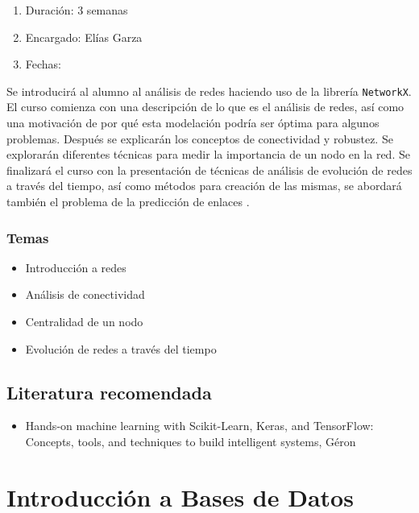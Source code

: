 \documentclass{article}
\begin{document}
            \begin{enumerate}
                \item Duración: 3 semanas
                \item Encargado: Elías Garza
                \item Fechas:
            \end{enumerate}

            Se introducirá al alumno al análisis de redes haciendo uso de la librería \texttt{NetworkX}. El curso comienza con una descripción de lo que es el análisis de redes, así como una motivación de por qué esta modelación podría ser óptima para algunos problemas. Después se explicarán los conceptos de conectividad y robustez. Se explorarán diferentes técnicas para medir la importancia de un nodo en la red. Se finalizará el curso con la presentación de técnicas de análisis de evolución de redes a través del tiempo, así como métodos para creación de las mismas, se abordará también el problema de la predicción de enlaces \cite{network-analysis}.

            \subsubsection{Temas}

                \begin{itemize}
                    \item Introducción a redes
                    \item Análisis de conectividad
                    \item Centralidad de un nodo
                    \item Evolución de redes a través del tiempo
                \end{itemize}
        
        \subsection{Literatura recomendada}

            \begin{itemize}
                \item Hands-on machine learning with Scikit-Learn, Keras, and TensorFlow: Concepts, tools, and techniques to build intelligent systems, Géron \cite{geron2019hands}
            \end{itemize}

    \section{Introducción a Bases de Datos}
\end{document}
